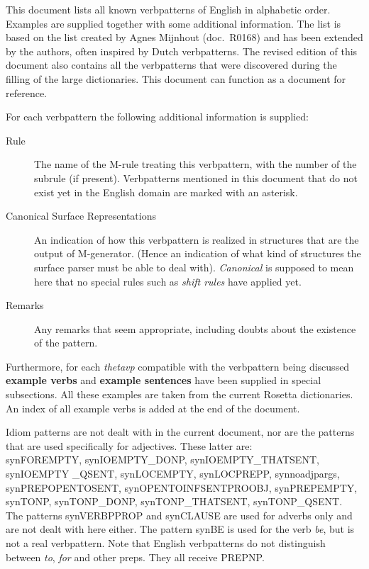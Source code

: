 This document lists all known verbpatterns of English in alphabetic order.
Examples are supplied together with some additional information. 
The list is based on the 
list created by Agnes Mijnhout (doc.\ R0168) and has been extended by the 
authors, often inspired by Dutch verbpatterns. The revised edition of this 
document also contains all the verbpatterns that were discovered during the 
filling of the large dictionaries. This document can function as a document 
for reference. 

For each verbpattern the following additional information is supplied:
\begin{description}
  \item[Rule] The name of the M-rule treating this verbpattern, with the number 
of the subrule (if present). Verbpatterns mentioned in this document that do 
not exist yet in the English domain are marked with an asterisk. 
  \item[Canonical Surface Representations] An indication of how this 
verbpattern is realized in structures that are the output of M-generator.
(Hence an indication of what kind of structures the surface parser must be
able to deal with). {\em  Canonical\/} is supposed to mean here that no
special rules such as {\em  shift rules\/}
have applied yet. 
  \item[Remarks]    Any remarks that seem appropriate, including doubts about 
the existence of the pattern.
\end{description}

Furthermore, for each {\em  thetavp\/} compatible with the verbpattern
being discussed {\bf example verbs} and {\bf example sentences} have been
supplied in special subsections. All these examples are taken from the current 
Rosetta dictionaries. An index of all example verbs is added at the 
end of the document.

Idiom patterns are not dealt with in the current document, nor are the patterns 
that are used specifically for adjectives. These latter are:\\
synFOREMPTY, synIOEMPTY\_DONP, synIOEMPTY\_THATSENT, synIOEMPTY
\_QSENT, 
synLOCEMPTY, synLOCPREPP, synnoadjpargs, 
synPREPOPENTOSENT, syn\-OPEN\-TOINF\-SENT\-PROOBJ, synPREPEMPTY, synTONP, 
synTONP\_DONP, synTONP\_THATSENT, synTONP\_QSENT.\\
The patterns synVERBPPROP and synCLAUSE are used for adverbs only and are not 
dealt with here either. The pattern synBE is used for the verb {\em be\/}, but 
is not a real verbpattern. Note that English verbpatterns do not distinguish 
between {\em to\/}, {\em for\/} and other preps. They all receive PREPNP.\\


